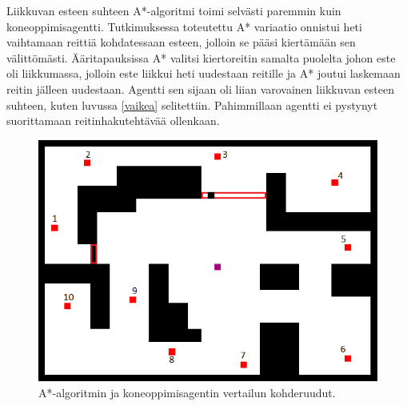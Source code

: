 \documentclass[utf8]{gradu3}
\begin{document}
Liikkuvan esteen suhteen A*-algoritmi toimi selvästi paremmin kuin koneoppimisagentti. Tutkimuksessa toteutettu A* variaatio onnistui heti vaihtamaan reittiä kohdatessaan esteen, jolloin se pääsi kiertämään sen välittömästi. Ääritapauksissa A* valitsi kiertoreitin samalta puolelta johon este oli liikkumassa, jolloin este liikkui heti uudestaan reitille ja A* joutui laskemaan reitin jälleen uudestaan. Agentti sen sijaan oli liian varovainen liikkuvan esteen suhteen, kuten luvussa \ref{vaikea} selitettiin. Pahimmillaan agentti ei pystynyt suorittamaan reitinhakutehtävää ollenkaan.

\begin{figure}[h]
\centering
\includegraphics[width=12cm]{area_difficult_test_targets.png}
\caption{A*-algoritmin ja koneoppimisagentin vertailun kohderuudut.}
\label{testtargets}
\end{figure}
\end{document}
